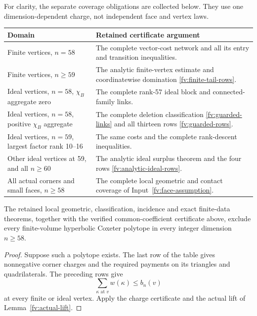 For clarity, the separate coverage obligations are collected below.
They use one dimension-dependent charge, not independent face and
vertex laws.
\begin{center}\small
\begin{tabular}{p{}p{}}
\toprule
Domain&Retained certificate argument\\\midrule
Finite vertices, $n=58$&The complete vector-cost network and all its
 entry and transition inequalities.\\
Finite vertices, $n\ge59$&The analytic finite-vertex estimate and
 coordinatewise domination \eqref{fv:finite-tail-rows}.\\
Ideal vertices, $n=58$, $\chi_B$ aggregate zero&The complete rank-57
 ideal block and connected-family links.\\
Ideal vertices, $n=58$, positive $\chi_B$ aggregate&The complete
 deletion classification \eqref{fv:guarded-links} and all thirteen
 rows \eqref{fv:guarded-rows}.\\
Ideal vertices, $n=59$, largest factor rank 10--16&The same costs
 and the complete rank-descent inequalities.\\
Other ideal vertices at 59, and all $n\ge60$&The analytic ideal
 surplus theorem and the four rows \eqref{fv:analytic-ideal-rows}.\\
All actual corners and small faces, $n\ge58$&The complete local
 geometric and contact coverage of Input~\ref{fv:face-assumption}.\\
\bottomrule
\end{tabular}
\end{center}

\begin{theorem}\label{fv:recovery}
The retained local geometric, classification, incidence and exact
finite-data theorems, together with the verified common-coefficient
certificate above, exclude every finite-volume hyperbolic Coxeter
polytope in every integer dimension $n\ge58$.
\end{theorem}

\begin{proof}
Suppose such a polytope exists. The last row of the table gives
nonnegative corner charges and the required payments on its triangles
and quadrilaterals. The preceding rows give
\[
 \sum_{\kappa\text{ at }v}w(\kappa)\le b_n(v)
\]
at every finite or ideal vertex. Apply the charge certificate and the
actual lift of Lemma~\ref{fv:actual-lift}.
\end{proof}

